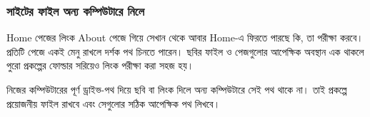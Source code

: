 \subsubsection{সাইটের ফাইল অন্য কম্পিউটারে নিলে}
Home পেজের লিংক About পেজে গিয়ে সেখান থেকে আবার Home-এ ফিরতে পারছে কি, তা পরীক্ষা করবে। প্রতিটি পেজে একই মেনু রাখলে দর্শক পথ চিনতে পারেন। ছবির ফাইল ও পেজগুলোর আপেক্ষিক অবস্থান এক থাকলে পুরো প্রকল্পের ফোল্ডার সরিয়েও লিংক পরীক্ষা করা সহজ হয়।

নিজের কম্পিউটারের পূর্ণ ড্রাইভ-পথ দিয়ে ছবি বা লিংক দিলে অন্য কম্পিউটারে সেই পথ থাকে না। তাই প্রকল্পে প্রয়োজনীয় ফাইল রাখবে এবং সেগুলোর সঠিক আপেক্ষিক পথ লিখবে।
